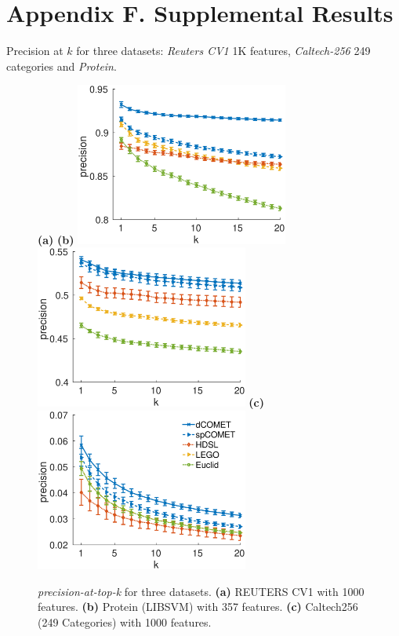 \documentclass[twoside,11pt]{article}
\begin{document}
\section*{Appendix F. Supplemental Results}
Precision at $k$ for three datasets: {\em Reuters CV1} 1K features, {\em Caltech-256} 249 categories and {\em Protein}.
\begin{figure}[ht]
{
  \centering
  {\bf(a)} \hspace{170pt} {\bf(b)} \hspace{190pt} \newline\newline
  \includegraphics[width=7cm]{precision@k_rcv1_4_ig1000}
  \includegraphics[width=7cm]{precision@k_protein}
  \newline
  {\bf (c)} \hspace{140pt}  \newline
  \includegraphics[width=7cm]{precision@k_Caltech256_with_249Categories}
  \caption{\textit{precision-at-top-k} for three datasets. {\bf (a)} REUTERS CV1 with 1000 features. {\bf (b)} Protein (LIBSVM) with 357 features. {\bf (c)} Caltech256 (249 Categories) with 1000 features.}
}
\end{figure}



\vskip 0.2in
\clearpage 

\end{document}
